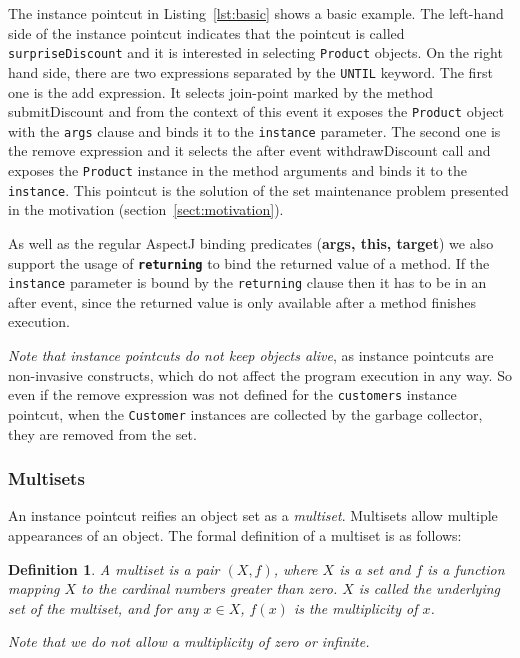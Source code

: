 \documentclass{acm_proc_article-sp}
\newtheorem{mydef}{Definition}
\begin{document}
The instance pointcut in Listing~\ref{lst:basic} shows a basic example. The left-hand side of the instance pointcut indicates that the pointcut is called \lstinline{surpriseDiscount} and it is interested in selecting \lstinline{Product} objects. 
On the right hand side, there are two expressions separated by the \lstinline{UNTIL} keyword. The first one is the add expression. It selects join-point marked by the method \textsf{submitDiscount} and from the context of this event it exposes the \lstinline{Product} object with the \lstinline{args} clause and binds it to the \lstinline{instance} parameter. 
The second one is the remove expression and it selects the after event \textsf{withdrawDiscount} call and exposes the \lstinline{Product} instance in the method arguments and binds it to the \lstinline{instance}.
This pointcut is the solution of the set maintenance problem presented in the motivation (section~\ref{sect:motivation}).
 
As well as the regular AspectJ binding predicates (\textsf{\textbf{args, this, target}}) we also support the usage of \texttt{\textbf{returning}} to bind the returned value of a method. 
If the \lstinline{instance} parameter is bound by the \lstinline{returning} clause then it has to be in an after event, since the returned value is only available after a method finishes execution. 

\emph{Note that instance pointcuts do not keep objects alive}, as instance pointcuts are non-invasive constructs, which do not affect the program execution in any way. So even if the remove expression was not defined for the \lstinline{customers} instance pointcut, when the \lstinline{Customer} instances are collected by the garbage collector, they are removed from the set. 

\subsubsection{Multisets}
An instance pointcut reifies an object set as a \emph{multiset}. Multisets allow multiple appearances of an object. The formal definition of a multiset is as follows:

\begin{mydef}
\label{def:multiset}
A multiset is a pair $(X, f)$, where $X$ is a set and $f$ is a function mapping $X$ to the cardinal numbers greater than zero. $X$ is called the underlying set of the multiset, and for any $x \in X$, $f(x)$ is the multiplicity of $x$.

Note that we do not allow a multiplicity of zero or infinite.
\end{mydef}
\end{document}
